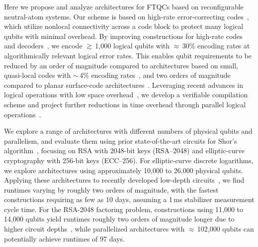 \documentclass[reprint,twocolumn,secnumarabic,amssymb, aps, prx]{revtex4-2}
\newcommand{\trsatime}{97 days}
\newcommand{\tecctime}{10 days}
\newcommand{\ecc}{\mbox{ECC--256}}
\newcommand{\rsa}{\mbox{RSA--2048}}
\begin{document}
Here we propose and analyze architectures for FTQCs based on reconfigurable neutral-atom systems. Our scheme is based on high-rate error-correcting codes~\cite{Breuckmann2021, panteleev2021quantum, panteleev2022asymptotically, leverrier2022quantum, dinur2022good, bravyi2024high, xu2024constant}, which utilize nonlocal connectivity across a code block to protect many logical qubits with minimal overhead. By improving constructions for high-rate codes and decoders~\cite{hillmann2024localized}, we encode $\gtrsim$\,1{,}000 logical qubits with $\approx$\,30\% encoding rates at algorithmically relevant logical error rates. This enables qubit requirements to be reduced by an order of magnitude compared to architectures based on small, quasi-local codes with $\sim$\,4\% encoding rates~\cite{yoder2025tour, yang2026rascql, webster2026pinnacle}, and two orders of magnitude compared to planar surface-code architectures~\cite{gidney2025how}. Leveraging recent advances in logical operations with low space overhead~\cite{cohen2022low, cross2024improved, gidney2024magic, xu2025fast, zheng2025high}, we develop a verifiable compilation scheme and project further reductions in time overhead through parallel logical operations~\cite{zheng2025high, cuccaro2004new}. 

We explore a range of architectures with different numbers of physical qubits and parallelism, and evaluate them using prior state-of-the-art circuits for Shor’s algorithm~\cite{gidney2019how, chevignard2025reducing, gidney2025how, babbush2026quantum}, focusing on RSA with 2048-bit keys (\rsa) and elliptic-curve cryptography with 256-bit keys (\ecc). For elliptic-curve discrete logarithms, we explore architectures using approximately 10,000 to 26,000 physical qubits. Applying these architectures to recently developed low-depth circuits~\cite{babbush2026quantum}, we find runtimes varying by roughly two orders of magnitude, with the fastest constructions requiring as few as \tecctime, assuming a 1\,ms stabilizer measurement cycle time. For the RSA-2048 factoring problem, constructions using 11,000 to 14,000 qubits yield runtimes roughly two orders of magnitude longer due to  higher circuit depths~\cite{gidney2019how, gidney2025how}, while parallelized architectures with $\approx$\,102,000 qubits can potentially achieve runtimes of \trsatime.
\end{document}
